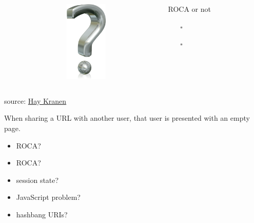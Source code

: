 \documentclass{beamer}
\newcommand{\rocaok}{\ding{51}}
\newcommand{\rocafail}{\ding{55}}
\begin{document}
\begin{frame}{\insertsectionhead}
  \vspace*{0.5in}

  \begin{columns}
    \begin{column}{2.2cm}
    \end{column}

    \begin{column}{2.2cm}
      \includegraphics[width=2cm]{images/quiz.png}
    \end{column}

    \begin{column}{6.6cm}
      ROCA or not
      \vspace{0.3cm}
      \begin{itemize}
        \item[$\square$] \rocaok
        \item[$\square$] \rocafail
      \end{itemize}
    \end{column}
  \end{columns}

  \vspace*{0.4in}
  \tiny source: \href{http://commons.wikimedia.org/wiki/File:Question_mark_3d.png}{Hay Kranen}
\end{frame}

\begin{frame}
  When sharing a URL with another user, that user is presented with an empty page.

  \vspace{0.3cm}
  \begin{itemize}
    \item<1|only@1>[\Large $\square$] \Large ROCA?
    \item<2|only@2>[\Large \rocafail] \Large ROCA?
    \item<2> session state?
    \item<2> JavaScript problem?
    \item<2> hashbang URIs?
  \end{itemize}

\end{frame}
\end{document}
